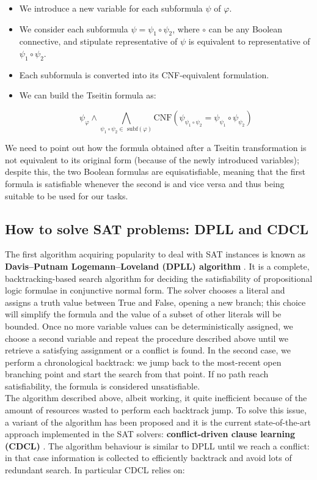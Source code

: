 \begin{itemize}
    \item We introduce a new variable for each subformula $\psi$ of $\varphi$.
    \item We consider each subformula $\psi = \psi_1 \circ \psi_2$, where $\circ$ can be any Boolean connective, and stipulate representative of $\psi$ is equivalent to representative of $\psi_1 \circ \psi_2$.
    \item Each subformula is converted into its CNF-equivalent formulation.
    \item We can build the Tseitin formula as:
    
    \begin{equation}
        \psi_\varphi \wedge \bigwedge_{\psi_1 \circ \psi_2 \in \textrm{  subf}(\varphi)} \textrm{CNF}(\psi_{\psi_1 \circ \psi_2} = \psi_{\psi_1} \circ \psi_{\psi_2})
    \end{equation}
\end{itemize}

We need to point out how the formula obtained after a Tseitin transformation is not equivalent to its original form (because of the newly introduced variables); despite this, the two Boolean formulas are equisatisfiable, meaning that the first formula is satisfiable whenever the second is and vice versa and thus being suitable to be used for our tasks.

\subsection{How to solve SAT problems: DPLL and CDCL}

The first algorithm acquiring popularity to deal with SAT instances is known as \textbf{Davis–Putnam Logemann–Loveland (DPLL) algorithm} \cite{dpll}. It is a complete, backtracking-based search algorithm for deciding the satisfiability of propositional logic formulae in conjunctive normal form. The solver chooses a literal and assigns a truth value between True and False, opening a new branch; this choice will simplify the formula and the value of a subset of other literals will be bounded. Once no more variable values can be deterministically assigned, we choose a second variable and repeat the procedure described above until we retrieve a satisfying assignment or a conflict is found. In the second case, we perform a chronological backtrack: we jump back to the most-recent open branching point and start the search from that point. If no path reach satisfiability, the formula is considered unsatisfiable. \\
The algorithm described above, albeit working, it quite inefficient because of the amount of resources wasted to perform each backtrack jump. To solve this issue, a variant of the algorithm has been proposed and it is the current state-of-the-art approach implemented in the SAT solvers: \textbf{conflict-driven clause learning (CDCL)} \cite{cdcl}. The algorithm behaviour is similar to DPLL until we reach a conflict: in that case information is collected to efficiently backtrack and avoid lots of redundant search. In particular CDCL relies on: \\

